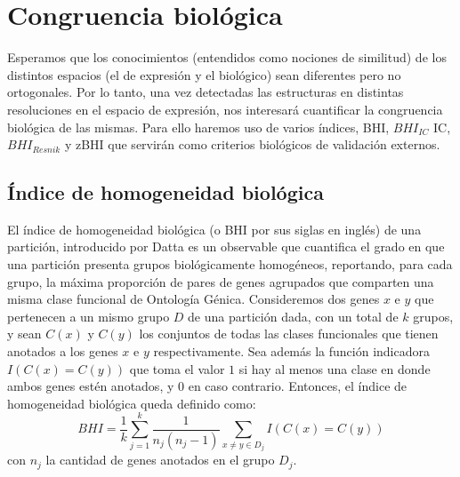 \chapter{Congruencia biológica}
Esperamos que los conocimientos (entendidos como nociones de similitud) de los distintos espacios (el de expresión y el biológico) sean diferentes pero no ortogonales. Por lo tanto, una vez detectadas las estructuras en distintas resoluciones en el espacio de expresión, nos interesará cuantificar la congruencia biológica de las mismas. Para ello haremos uso de varios índices, BHI, $BHI_{IC}$ IC, $BHI_{Resnik}$ y zBHI que servirán como criterios biológicos de validación externos.

\section{Índice de homogeneidad biológica}
El índice de homogeneidad biológica (o BHI por sus siglas en inglés) de una partición, introducido por Datta \cite{Datta2006} es un observable que cuantifica el grado en que una partición presenta grupos biológicamente homogéneos, reportando, para cada grupo, la máxima proporción de pares de genes agrupados que comparten una misma clase funcional de Ontología Génica. Consideremos dos genes $x$ e $y$ que pertenecen a un mismo grupo $D$ de una partición dada, con un total de $k$ grupos, y sean $C(x)$ y $C(y)$ los conjuntos de todas las clases funcionales que tienen anotados a los genes $x$ e $y$ respectivamente. Sea además la función indicadora $I(C(x)=C(y))$ que toma el valor $1$ si hay al menos una clase en donde ambos genes estén anotados, y $0$ en caso contrario. Entonces, el índice de homogeneidad biológica queda definido como:
\begin{equation}
	BHI = \frac{1}{k}\sum\limits_{j=1}^k\frac{1}{n_j(n_j-1)}\sum\limits_{x\neq y\in D_j}I(C(x)=C(y))
\end{equation}
con $n_j$ la cantidad de genes anotados en el grupo $D_j$.\\

